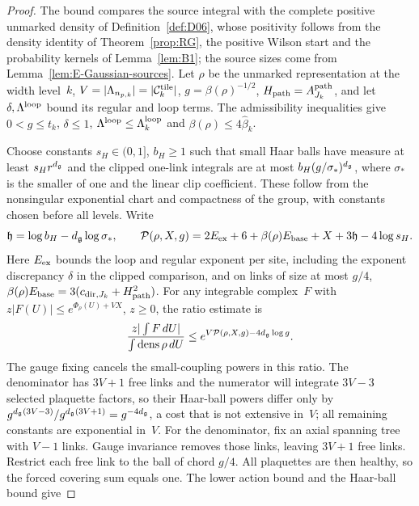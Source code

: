 \begin{proof}
The bound compares the source integral with the complete positive unmarked density of Definition~\ref{def:D06}, whose positivity follows from the density identity of Theorem~\ref{prop:RG}, the positive Wilson start and the probability kernels of Lemma~\ref{lem:B1}; the source sizes come from Lemma~\ref{lem:E-Gaussian-sources}. Let $\rho$ be the unmarked representation at the width level~$k$, $V=|\Lambda_{n_{p,k}}|=|\mathcal C^{\rm tile}_k|$, $g=\beta(\rho)^{-1/2}$, $H_{\rm path}=A_{J_k}^{\rm path}$, and let $\delta,\Lambda^{\rm loop}$ bound its regular and loop terms. The admissibility inequalities give $0<g\le t_k$, $\delta\le1$, $\Lambda^{\rm loop}\le\Lambda_k^{\rm loop}$ and $\beta(\rho)\le4\widehat\beta_k$.

Choose constants $s_H\in(0,1]$, $b_H\ge1$ such that small Haar balls have measure at least $s_Hr^{d_{\mathfrak{g}}}$ and the clipped one-link integrals are at most $b_H(g/\sigma_*)^{d_{\mathfrak{g}}}$, where $\sigma_*$ is the smaller of one and the linear clip coefficient. These follow from the nonsingular exponential chart and compactness of the group, with constants chosen before all levels. Write
\begin{equation*}
 \mathfrak h=\log b_H-d_{\mathfrak{g}}\log\sigma_*,\qquad
 \mathcal P(\rho,X,g)=2E_{\rm ex}+6+
 \beta(\rho)E_{\rm base}+X+3\mathfrak h-4\log s_H.
\end{equation*}
Here $E_{\rm ex}$ bounds the loop and regular exponent per site, including the exponent discrepancy $\delta$ in the clipped comparison, and on links of size at most $g/4$,
$\beta(\rho)E_{\rm base}=3(c_{{\rm dir},J_k}+H_{\rm path}^2)$. For any integrable complex~$F$ with
$z|F(U)|\le e^{\Phi_\rho(U)+VX}$, $z\ge0$, the ratio estimate is
\begin{equation}\label{eq:E-positive-ratio}
 \frac{z|\int F\,dU|}{\int\operatorname{dens}\rho\,dU}
 \le e^{V\mathcal P(\rho,X,g)-4d_{\mathfrak{g}}\log g}.
\end{equation}
The gauge fixing cancels the small-coupling powers in this ratio. The denominator has $3V+1$ free links and the numerator will integrate $3V-3$ selected plaquette factors, so their Haar-ball powers differ only by $g^{d_{\mathfrak{g}}(3V-3)}/g^{d_{\mathfrak{g}}(3V+1)}=g^{-4d_{\mathfrak{g}}}$, a cost that is not extensive in~$V$; all remaining constants are exponential in~$V$. For the denominator, fix an axial spanning tree with $V-1$ links. Gauge invariance removes those links, leaving $3V+1$ free links. Restrict each free link to the ball of chord $g/4$. All plaquettes are then healthy, so the forced covering sum equals one. The lower action bound and the Haar-ball bound give

\end{proof}
